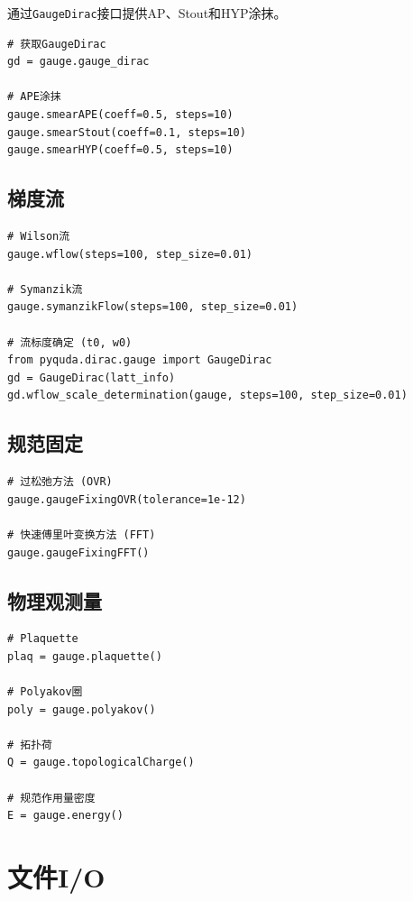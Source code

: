 \documentclass[12pt,a4paper]{ctexart}
\begin{document}
通过\texttt{GaugeDirac}接口提供AP、Stout和HYP涂抹。

\begin{lstlisting}[caption={规范涂抹}]
# 获取GaugeDirac
gd = gauge.gauge_dirac

# APE涂抹
gauge.smearAPE(coeff=0.5, steps=10)
gauge.smearStout(coeff=0.1, steps=10)
gauge.smearHYP(coeff=0.5, steps=10)
\end{lstlisting}

\subsection{梯度流}

\begin{lstlisting}[caption={梯度流}]
# Wilson流
gauge.wflow(steps=100, step_size=0.01)

# Symanzik流
gauge.symanzikFlow(steps=100, step_size=0.01)

# 流标度确定 (t0, w0)
from pyquda.dirac.gauge import GaugeDirac
gd = GaugeDirac(latt_info)
gd.wflow_scale_determination(gauge, steps=100, step_size=0.01)
\end{lstlisting}

\subsection{规范固定}

\begin{lstlisting}[caption={规范固定}]
# 过松弛方法 (OVR)
gauge.gaugeFixingOVR(tolerance=1e-12)

# 快速傅里叶变换方法 (FFT)
gauge.gaugeFixingFFT()
\end{lstlisting}

\subsection{物理观测量}

\begin{lstlisting}[caption={规范观测量}]
# Plaquette
plaq = gauge.plaquette()

# Polyakov圈
poly = gauge.polyakov()

# 拓扑荷
Q = gauge.topologicalCharge()

# 规范作用量密度
E = gauge.energy()
\end{lstlisting}

\section{文件I/O}
\end{document}
